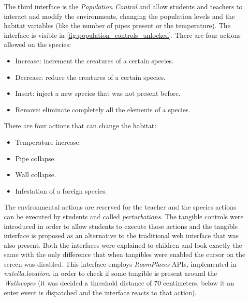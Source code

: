 The third interface is the \textit{Population Control} and allow students and teachers to interact and modify the environments, changing the population levels and the habitat variables (like the number of pipes present or the temperature). The interface is visible in \ref{fig:population_controls_unlocked}.
There are four actions allowed on the species:
\begin{itemize}
    \item Increase: increment the creatures of a certain species.
    \item Decrease: reduce the creatures of a certain species.
    \item Insert: inject a new species that was not present before.
    \item Remove: eliminate completely all the elements of a species.
\end{itemize}

There are four actions that can change the habitat:
\begin{itemize}
    \item Temperature increase.
    \item Pipe collapse.
    \item Wall collapse.
    \item Infestation of a foreign species.
\end{itemize}

The environmental actions are reserved for the teacher and the species actions can be executed by students and called \textit{perturbations}. The tangible controls were introduced in order to allow students to execute those actions and the tangible interface is proposed as an alternative to the traditional web interface that was also present. Both the interfaces were explained to children and look exactly the same with the only difference that when tangibles were enabled the cursor on the screen was disabled. This interface employs \textit{RoomPlaces} APIs, implemented in \textit{nutella.location}, in order to check if some tangible is present around the \textit{Wallscopes} (it was decided a threshold distance of 70 centimeters, below it an enter event is dispatched and the interface reacts to that action).

